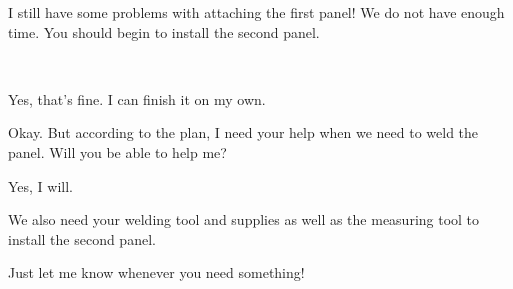 \begin{description}
  \item \textit{\textbf{\fontsize{9pt}{12pt}\selectfont{D1. Astronaut:}}} I
  still have some problems with attaching the first panel! We do not have enough
  time. You should begin to install the second panel.\\

  \item {}\\
  
  \item \textit{\textbf{\fontsize{9pt}{12pt}\selectfont{D3. Astronaut:}}} Yes,
  that's fine. I can finish it on my own.\\

  \item \textit{\textbf{\fontsize{9pt}{12pt}\selectfont{D4. Robot:}}} Okay. But
  according to the plan, I need your help when we need to weld the panel. Will
  you be able to help me?\\

  \item \textit{\textbf{\fontsize{9pt}{12pt}\selectfont{D5. Astronaut:}}} Yes, I
  will.\\
  
  \item \textit{\textbf{\fontsize{9pt}{12pt}\selectfont{D6. Robot:}}} We also
  need your welding tool and supplies as well as the measuring tool to install
  the second panel.\\
  
  \item \textit{\textbf{\fontsize{9pt}{12pt}\selectfont{D7. Astronaut:}}} Just
  let me know whenever you need something!\\
  
  \item {}\\
  

\end{description}
